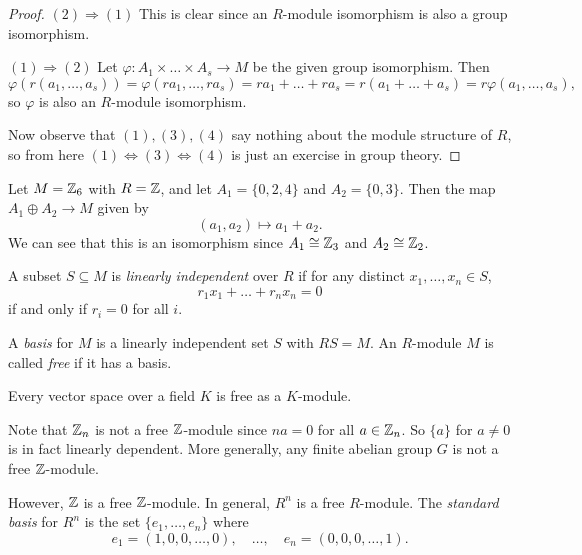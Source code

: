 \begin{proof}
  $(2) \Rightarrow (1)$ This is clear since an $R$-module
  isomorphism is also a group isomorphism.

  $(1) \Rightarrow (2)$ Let
  $\varphi : A_1 \times \dots \times A_s \to M$ be the
  given group isomorphism. Then
  \[
    \varphi(r(a_1, \dots, a_s))
    = \varphi(ra_1, \dots, ra_s)
    = ra_1 + \dots + ra_s
    = r(a_1 + \dots + a_s)
    = r\varphi(a_1, \dots, a_s),
  \]
  so $\varphi$ is also an $R$-module isomorphism.

  Now observe that $(1), (3), (4)$ say nothing about the
  module structure of $R$, so
  from here $(1) \Leftrightarrow (3) \Leftrightarrow (4)$
  is just an exercise in group theory.
\end{proof}

\begin{example}
  Let $M = \mathbb{Z}_6$ with $R = \mathbb{Z}$, and let
  $A_1 = \{0, 2, 4\}$ and $A_2 = \{0, 3\}$. Then
  the map $A_1 \oplus A_2 \to M$ given by
  \[
    (a_1, a_2) \mapsto a_1 + a_2.
  \]
  We can see that this is an isomorphism since
  $A_1 \cong \mathbb{Z}_3$ and $A_2 \cong \mathbb{Z}_2$.
\end{example}

\begin{definition}
  A subset $S \subseteq M$ is \emph{linearly independent}
  over $R$ if for any distinct $x_1, \dots, x_n \in S$,
  \[
    r_1 x_1 + \dots + r_n x_n = 0
  \]
  if and only if $r_i = 0$ for all $i$.
\end{definition}

\begin{definition}
  A \emph{basis} for $M$ is a linearly independent
  set $S$ with $RS = M$. An $R$-module $M$ is called
  \emph{free} if it has a basis.
\end{definition}

\begin{example}
  Every vector space over a field $K$ is free as a
  $K$-module.
\end{example}

\begin{example}
  Note that $\mathbb{Z}_n$ is not a free $\mathbb{Z}$-module since
  $na = 0$ for all $a \in \mathbb{Z}_n$. So $\{a\}$ for $a \ne 0$
  is in fact linearly dependent. More generally,
  any finite abelian group $G$ is not a free
  $\mathbb{Z}$-module.
\end{example}

\begin{example}
  However, $\mathbb{Z}$ is a free $\mathbb{Z}$-module. In general,
  $R^n$ is a free $R$-module. The \emph{standard basis}
  for $R^n$ is the set $\{e_1, \dots, e_n\}$ where
  \[
    e_1 = (1, 0, 0, \dots, 0),
    \quad \dots, \quad e_n = (0, 0, 0, \dots, 1).
  \]
\end{example}

